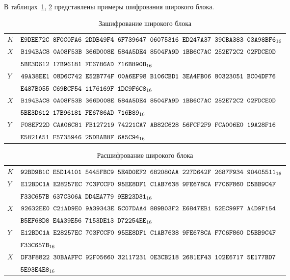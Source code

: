 \label{TEST.WBlock}

В таблицах~\ref{Table.TEST.WBLE}, \ref{Table.TEST.WBLD}
представлены примеры шифрования широкого блока.

\begin{table}[H]
\caption{Зашифрование широкого блока}\label{Table.TEST.WBLE}
\begin{tabular}{|l|l|}
\hline
$K$ & 
$\texttt{E9DEE72C~8F0C0FA6~2DDB49F4~6F739647~06075316~ED247A37~39CBA383~03A98BF6}_{16}$\\
\ddhline
$X$ &
$\texttt{B194BAC8~0A08F53B~366D008E~584A5DE4~8504FA9D~1BB6C7AC~252E72C2~02FDCE0D}$\\
&
$\texttt{5BE3D612~17B96181~FE6786AD~716B890B}_{16}$\\
\dhline
$Y$ &
$\texttt{49A38EE1~08D6C742~E52B774F~00A6EF98~B106CBD1~3EA4FB06~80323051~BC04DF76}$\\
&
$\texttt{E487B055~C69BCF54~1176169F~1DC9F6C8}_{16}$\\
\ddhline
$X$ &
$\texttt{B194BAC8~0A08F53B~366D008E~584A5DE4~8504FA9D~1BB6C7AC~252E72C2~02FDCE0D}$\\
&
$\texttt{5BE3D612~17B96181~FE6786AD~716B89}_{16}$\\
\dhline
$Y$ &
$\texttt{F08EF22D~CAA06C81~FB127219~74221CA7~AB82C628~56FCF2F9~FCA006E0~19A28F16}$\\
&
$\texttt{E5821A51~F5735946~25DBAB8F~6A5C94}_{16}$\\
\hline
\end{tabular}
\end{table}

\begin{table}[H]
\caption{Расшифрование широкого блока}\label{Table.TEST.WBLD}
\begin{tabular}{|l|l|}
\hline
$K$ & 
$\texttt{92BD9B1C~E5D14101~5445FBC9~5E4D0EF2~682080AA~227D642F~2687F934~90405511}_{16}$\\
\ddhline
$Y$ &
$\texttt{E12BDC1A~E28257EC~703FCCF0~95EE8DF1~C1AB7638~9FE678CA~F7C6F860~D5BB9C4F}$\\
& 
$\texttt{F33C657B~637C306A~DD4EA779~9EB23D31}_{16}$\\
\dhline
$X$ &
$\texttt{92632EE0~C21AD9E0~9A39343E~5C07DAA4~889B03F2~E6847EB1~52EC99F7~A4D9F154}$\\
&
$\texttt{B5EF68D8~E4A39E56~7153DE13~D72254EE}_{16}$\\
\ddhline
$Y$ &
$\texttt{E12BDC1A~E28257EC~703FCCF0~95EE8DF1~C1AB7638~9FE678CA~F7C6F860~D5BB9C4F}$\\
& 
$\texttt{F33C657B}_{16}$\\
\dhline
$X$ &
$\texttt{DF3F8822~30BAAFFC~92F05660~32117231~0E3CB218~2681EF43~102E6717~5E177BD7}$\\
&
$\texttt{5E93E4E8}_{16}$\\
\hline
\end{tabular}
\end{table}
